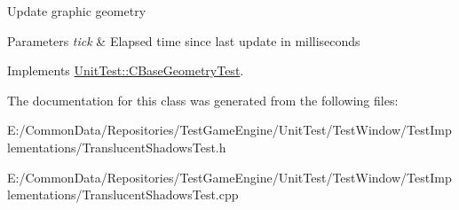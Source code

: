 Update graphic geometry 
\begin{DoxyParams}{Parameters}
{\em tick} & Elapsed time since last update in milliseconds \\
\hline
\end{DoxyParams}


Implements \mbox{\hyperlink{class_unit_test_1_1_c_base_geometry_test_afe9560d667ef457f7a203453c10593fd}{Unit\+Test\+::\+C\+Base\+Geometry\+Test}}.



The documentation for this class was generated from the following files\+:\begin{DoxyCompactItemize}
\item 
E\+:/\+Common\+Data/\+Repositories/\+Test\+Game\+Engine/\+Unit\+Test/\+Test\+Window/\+Test\+Implementations/Translucent\+Shadows\+Test.\+h\item 
E\+:/\+Common\+Data/\+Repositories/\+Test\+Game\+Engine/\+Unit\+Test/\+Test\+Window/\+Test\+Implementations/Translucent\+Shadows\+Test.\+cpp\end{DoxyCompactItemize}

